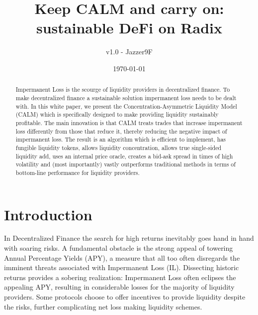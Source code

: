 \documentclass [10pt, twoside] {article}
\newcommand{\version}{{v1.0}}
\begin{document}
\title{Keep CALM and carry on: sustainable DeFi on Radix}

\author {\version { }- Jazzer9F}

\date{\today}

\maketitle

\begin{abstract}
Impermanent Loss is the scourge of liquidity providers in decentralized finance. To make decentralized finance a sustainable solution impermanent loss needs to be dealt with. In this white paper, we present the Concentration-Asymmetric Liquidity Model (CALM) which is specifically designed to make providing liquidity sustainably profitable. The main innovation is that CALM treats trades that increase impermanent loss differently from those that reduce it, thereby reducing the negative impact of impermanent loss. The result is an algorithm which is efficient to implement, has fungible liquidity tokens, allows liquidity concentration, allows true single-sided liquidity add, uses an internal price oracle, creates a bid-ask spread in times of high volatility and (most importantly) vastly outperforms traditional methods in terms of bottom-line performance for liquidity providers.
\end{abstract}


\section{Introduction}
In Decentralized Finance the search for high returns inevitably goes hand in hand with soaring risks. A fundamental obstacle is the strong appeal of towering Annual Percentage Yields (APY), a measure that all too often disregards the imminent threats associated with Impermanent Loss (IL). Dissecting historic returns provides a sobering realization: Impermanent Loss often eclipses the appealing APY, resulting in considerable losses for the majority of liquidity providers. Some protocols choose to offer incentives to provide liquidity despite the risks, further complicating net loss making liquidity schemes.
\end{document}
